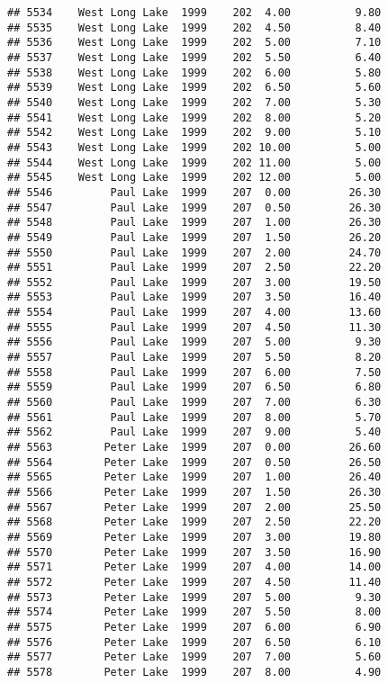 \documentclass[
]{article}
\begin{document}
\begin{verbatim}
## 5534    West Long Lake  1999    202  4.00          9.80
## 5535    West Long Lake  1999    202  4.50          8.40
## 5536    West Long Lake  1999    202  5.00          7.10
## 5537    West Long Lake  1999    202  5.50          6.40
## 5538    West Long Lake  1999    202  6.00          5.80
## 5539    West Long Lake  1999    202  6.50          5.60
## 5540    West Long Lake  1999    202  7.00          5.30
## 5541    West Long Lake  1999    202  8.00          5.20
## 5542    West Long Lake  1999    202  9.00          5.10
## 5543    West Long Lake  1999    202 10.00          5.00
## 5544    West Long Lake  1999    202 11.00          5.00
## 5545    West Long Lake  1999    202 12.00          5.00
## 5546         Paul Lake  1999    207  0.00         26.30
## 5547         Paul Lake  1999    207  0.50         26.30
## 5548         Paul Lake  1999    207  1.00         26.30
## 5549         Paul Lake  1999    207  1.50         26.20
## 5550         Paul Lake  1999    207  2.00         24.70
## 5551         Paul Lake  1999    207  2.50         22.20
## 5552         Paul Lake  1999    207  3.00         19.50
## 5553         Paul Lake  1999    207  3.50         16.40
## 5554         Paul Lake  1999    207  4.00         13.60
## 5555         Paul Lake  1999    207  4.50         11.30
## 5556         Paul Lake  1999    207  5.00          9.30
## 5557         Paul Lake  1999    207  5.50          8.20
## 5558         Paul Lake  1999    207  6.00          7.50
## 5559         Paul Lake  1999    207  6.50          6.80
## 5560         Paul Lake  1999    207  7.00          6.30
## 5561         Paul Lake  1999    207  8.00          5.70
## 5562         Paul Lake  1999    207  9.00          5.40
## 5563        Peter Lake  1999    207  0.00         26.60
## 5564        Peter Lake  1999    207  0.50         26.50
## 5565        Peter Lake  1999    207  1.00         26.40
## 5566        Peter Lake  1999    207  1.50         26.30
## 5567        Peter Lake  1999    207  2.00         25.50
## 5568        Peter Lake  1999    207  2.50         22.20
## 5569        Peter Lake  1999    207  3.00         19.80
## 5570        Peter Lake  1999    207  3.50         16.90
## 5571        Peter Lake  1999    207  4.00         14.00
## 5572        Peter Lake  1999    207  4.50         11.40
## 5573        Peter Lake  1999    207  5.00          9.30
## 5574        Peter Lake  1999    207  5.50          8.00
## 5575        Peter Lake  1999    207  6.00          6.90
## 5576        Peter Lake  1999    207  6.50          6.10
## 5577        Peter Lake  1999    207  7.00          5.60
## 5578        Peter Lake  1999    207  8.00          4.90

\end{verbatim}
\end{document}
